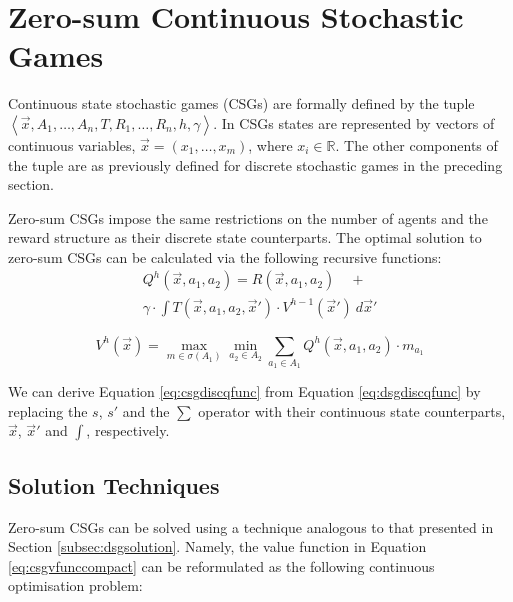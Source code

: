 \section{Zero-sum Continuous Stochastic Games}
\label{sec:csg}

Continuous state stochastic games (CSGs) are formally defined by the tuple
$ \left\langle \vec{x}, A_{1}, \ldots, A_{n}, T, R_{1}, \ldots, R_{n}, h, \gamma  \right\rangle$.
In CSGs states are represented by vectors of continuous variables, $\vec{x} = \left(x_1, \ldots, x_m \right)$, 
where $x_i \in \mathbb{R}$. The other components of the tuple are as 
previously defined for discrete stochastic games in the preceding section.

Zero-sum CSGs impose the same restrictions on the number of agents
and the reward structure as their discrete state counterparts. The 
optimal solution to zero-sum CSGs can be calculated via the 
following recursive functions:
{\footnotesize 
\abovedisplayskip=10pt
\belowdisplayskip=0pt
\begin{multline}
\label{eq:csgdiscqfunc}
  Q^{h}(\vec{x}, a_1, a_2) = R(\vec{x}, a_1, a_2) \quad + \\
   \gamma \cdot \int T(\vec{x}, a_1, a_2, \vec{x}') \cdot V^{h-1}(\vec{x}')\ d\vec{x}' 
\end{multline}
}%

{\footnotesize 
\abovedisplayskip=0pt
\belowdisplayskip=0pt
\begin{equation}
\label{eq:csgvfunccompact}
  V^{h}(\vec{x}) = \max_{m \in \sigma(A_1)} \min_{a_2 \in A_2} \sum_{a_1 \in A_1} Q^{h}(\vec{x}, a_1, a_2) \cdot m_{a_{1}}
\end{equation}
}%

We can derive Equation \eqref{eq:csgdiscqfunc} from Equation \eqref{eq:dsgdiscqfunc}
by replacing the $s$, $s'$ and the $\sum$ operator with their continuous
state counterparts, $\vec{x}$, $\vec{x}'$ and $\int$, respectively.
%

\subsection{Solution Techniques}

Zero-sum CSGs can be solved using a technique analogous to that 
presented in Section \ref{subsec:dsgsolution}. Namely, the value function in Equation
\eqref{eq:csgvfunccompact} can be reformulated as the following continuous 
optimisation problem:

